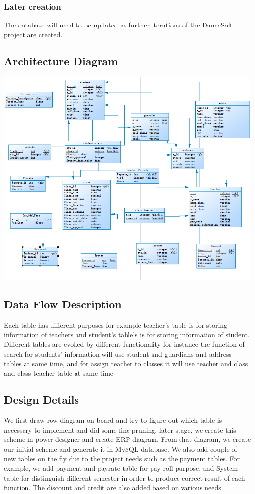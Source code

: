 \subsubsection{Later creation}
The database will need to be updated as further iterations of the DanceSoft project are created.


\subsection{ Architecture  Diagram}

 
\includegraphics[scale=0.8]{pics/database.png}\\

\subsection{Data Flow Description}
Each table has different purposes for example teacher's table is for storing information of teachers and student's table's is for storing information of student. Different tables are evoked by different functionality for instance the function of search for students' information will use student and guardians and address tables at same time, and for assign teacher to classes it will use teacher and class and class-teacher table at same time


\subsection{Design Details}
We first draw row diagram on board and try to figure out which table is necessary to implement and did some fine pruning. later stage, we create this scheme in power designer and create ERP diagram. From that diagram, we create our initial scheme and generate it in MySQL database. We also add couple of new tables on the fly due to the project needs such as the payment tables. For example, we add payment and payrate table for pay roll purpose, and System table for distinguish different semester in order to produce correct result of each function. The discount and credit are also added based on various needs.

